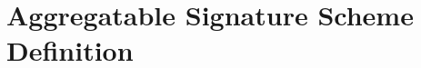 \section{Aggregatable Signature Scheme Definition}
\label{sec:multisig}
\begin{comment}
In this work we use an aggregatable 
signature scheme making explicit use of the proofs-of-possession (PoPs)~\cite{proofs_of_posession}.
For our concrete instantiation we use aggregatable BLS signatures with an efficient aggregation procedure, i.e., by adding together keys and by multiplying together signatures, and protect against rogue key attacks~\cite{proofs_of_posession} using PoPs. 
This is in contrast to other aggregation procedures that do not require PoPs for security 
but incur a higher computational cost (e.g., due to the use of multi-scalar multiplication~\cite{boneh_compact_multisig}). 
For our concrete use case of accountable light clients systems, our efficient signature aggregation method results 
in a simple and more efficient custom argument scheme (i.e., SNARK), which, in turn, compensates for the cost of having 
to work with PoPs. 
\end{comment}

